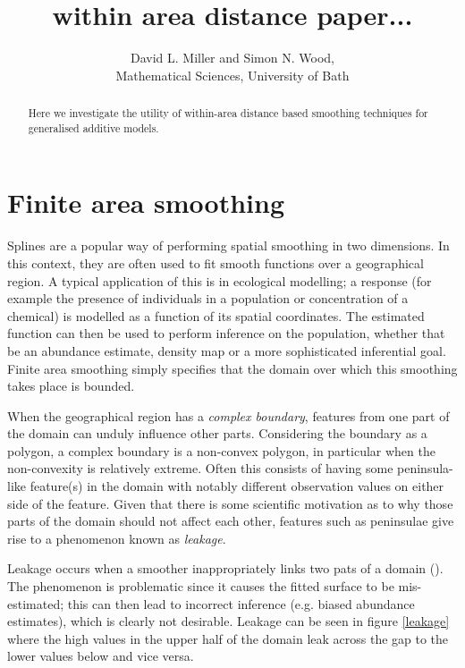 \documentclass[10pt]{article}
\begin{document}
\title{within area distance paper...}

\author{David L. Miller and Simon N. Wood,
\\ Mathematical Sciences, University of Bath
}


\maketitle
\begin{abstract}
Here we investigate the utility of within-area distance based smoothing techniques for generalised additive models.


\end{abstract}

\section{Finite area smoothing}

Splines are a popular way of performing spatial smoothing in two dimensions. In this context, they are often used to fit smooth functions over a geographical region. A typical application of this is in ecological modelling; a response (for example the presence of individuals in a population or concentration of a chemical) is modelled as a function of its spatial coordinates. The estimated function can then be used to perform inference on the population, whether that be an abundance estimate, density map or a more sophisticated inferential goal. Finite area smoothing simply specifies that the domain over which this smoothing takes place is bounded.

When the geographical region has a \emph{complex boundary}, features from one part of the domain can unduly influence other parts. Considering the boundary as a polygon, a complex boundary is a non-convex polygon, in particular when the non-convexity is relatively extreme. Often this consists of having some peninsula-like feature(s) in the domain with notably different observation values on either side of the feature. Given that there is some scientific motivation as to why those parts of the domain should not affect each other, features such as peninsulae give rise to a phenomenon known as \emph{leakage}.

Leakage occurs when a smoother inappropriately links two pats of a domain (\cite{soap}). The phenomenon is problematic since it causes the fitted surface to be mis-estimated; this can then lead to incorrect inference (e.g. biased abundance estimates), which is clearly not desirable. Leakage can be seen in figure \ref{leakage} where the high values in the upper half of the domain leak across the gap to the lower values below and vice versa.
\end{document}
